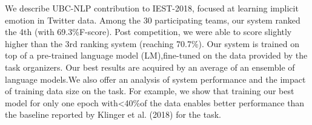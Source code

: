 We describe UBC-NLP contribution to IEST-2018,  focused  at  learning  implicit  emotion in  Twitter  data.   Among  the 30 participating teams, our system ranked the 4th (with 69.3\%F-score).   Post competition,  we were able to score slightly higher than the 3rd ranking system (reaching 70.7\%).  Our system is trained on top of a pre-trained language model (LM),fine-tuned on the data provided by the task organizers.  Our best results are acquired by an average  of  an  ensemble  of  language  models.We  also  offer  an  analysis  of  system  performance and the impact of training data size on the task.  For example, we show that training our best model for only one epoch with<40\%of the data enables better performance than the baseline reported by Klinger et al. (2018) for the task.
